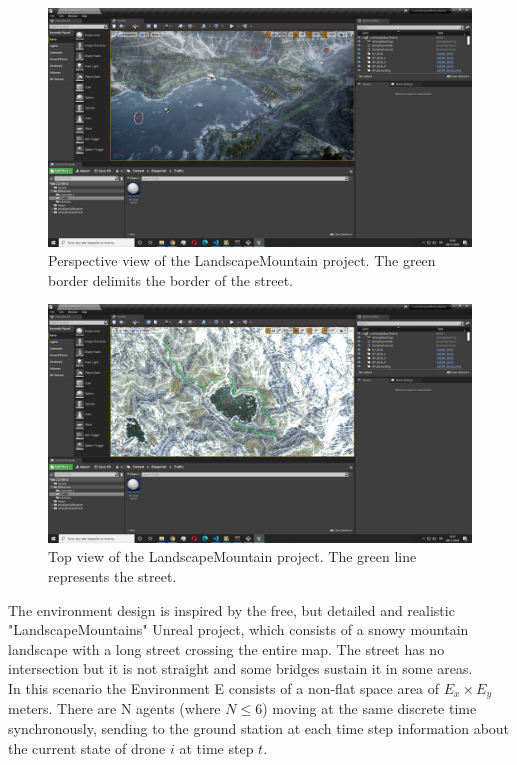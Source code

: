 \documentclass[LaM,binding=0.6cm]{sapthesis}
\begin{document}
\begin{figure}[hb!]
	\centering
	\includegraphics[width=1.0\columnwidth]{figures/Cattura6.PNG}
	\caption{Perspective view of the LandscapeMountain project. The green border delimits the border of the street.}
\end{figure}
\begin{figure}[!]
	\centering
	\includegraphics[width=1.0\columnwidth]{figures/Cattura7.PNG}
	\caption{Top view of the LandscapeMountain project. The green line represents the street.}
\end{figure}


The environment design is inspired by the free, but detailed and realistic "LandscapeMountains" Unreal project, which consists of a snowy mountain landscape with a long street crossing the entire map. The street has no intersection but it is not straight and some bridges sustain it in some areas.\\

In this scenario the Environment E consists of a non-flat space area of $E_x \times E_y$ meters. There are N agents (where $N\le6$) moving at the same discrete time synchronously, sending to the ground station at each time step information about the current state of drone $i$ at time step $t$.
\end{document}
